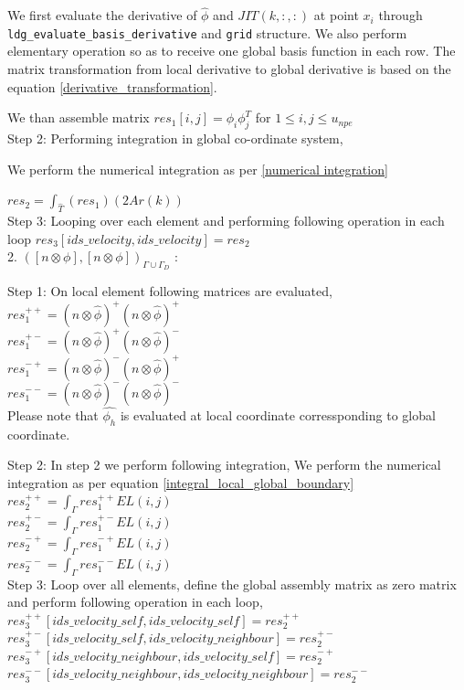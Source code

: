 \documentclass[a4paper]{book}
\begin{document}
We first evaluate the derivative of $\hat{\phi}$ and $JIT(k,:,:)$ at point $x_i$ through \verb|ldg_evaluate_basis_derivative| and \verb|grid| structure. We also perform elementary operation so as to receive one global basis function in each row. The matrix transformation from local derivative to global derivative is based on the equation \ref{derivative_transformation}.

We than assemble matrix $res_1[i,j]=\phi_i \phi_j^T$ for $1 \leq i,j \leq u_{npe}$\\

Step 2: Performing integration in global co-ordinate system,

We perform the numerical integration as per \ref{numerical integration} 

$res_2 = \int_{\hat{T}} (res_1) (2 Ar(k))$\\

Step 3: Looping over each element and performing following operation in each loop $res_3[ids\_velocity,ids\_velocity]=res_2$\\


2. $([n \otimes \phi], [n \otimes \phi])_{\Gamma \cup \Gamma_D}$ :

Step 1: On local element following matrices are evaluated,\\

$res_1^{++} = (n \otimes \hat{\phi})^+ (n \otimes \hat{\phi})^+$\\
$res_1^{+-} = (n \otimes \hat{\phi})^+ (n \otimes \hat{\phi})^-$\\
$res_1^{-+} = (n \otimes \hat{\phi})^- (n \otimes \hat{\phi})^+$\\
$res_1^{--} = (n \otimes \hat{\phi})^- (n \otimes \hat{\phi})^-$\\

Please note that $\hat{\phi_h}$ is evaluated at local coordinate corressponding to global coordinate.

Step 2: In step 2 we perform following integration, 
We perform the numerical integration as per equation \ref{integral_local_global_boundary}
\\ 
$res_2^{++} = \int_{\Gamma} res_1^{++} EL(i,j)$\\
$res_2^{+-} = \int_{\Gamma} res_1^{+-} EL(i,j)$\\
$res_2^{-+} = \int_{\Gamma} res_1^{-+} EL(i,j)$\\
$res_2^{--} = \int_{\Gamma} res_1^{--} EL(i,j)$\\

Step 3: Loop over all elements, define the global assembly matrix as zero matrix and perform following operation in each loop,
\\
$res_3^{++}[ids\_velocity\_self,ids\_velocity\_self] = res_2^{++}$\\
$res_3^{+-}[ids\_velocity\_self,ids\_velocity\_neighbour] = res_2^{+-}$\\
$res_3^{-+}[ids\_velocity\_neighbour,ids\_velocity\_self] = res_2^{-+}$\\
$res_3^{--}[ids\_velocity\_neighbour,ids\_velocity\_neighbour] = res_2^{--}$\\
\end{document}
